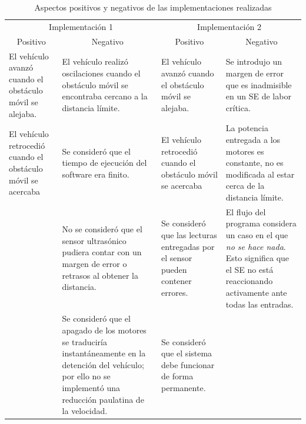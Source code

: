 \documentclass[journal]{IEEEtran}
\begin{document}
\begin{table}[!t]

\renewcommand{\arraystretch}{1.3}
\caption{Aspectos positivos y negativos de las implementaciones realizadas}
\label{tbl:aspectos-implementaciones}
\centering
{}
\begin{tabular}{p{4cm}p{4cm}p{4cm}p{4cm}}
\toprule

\multicolumn{2}{c}{Implementación 1} & \multicolumn{2}{c}{Implementación 2}\\
\cmidrule(r){1-2}  \cmidrule(r){3-4}

\multicolumn{1}{c}{Positivo} & \multicolumn{1}{c}{Negativo} & \multicolumn{1}{c}{Positivo} & \multicolumn{1}{c}{Negativo} \\
\midrule

El vehículo avanzó cuando el obstáculo móvil se alejaba.
&
El vehículo realizó oscilaciones cuando el obstáculo móvil se encontraba cercano a la distancia límite.
&
El vehículo avanzó cuando el obstáculo móvil se alejaba.
&
Se introdujo un margen de error que es inadmisible en un SE de labor crítica.
\\

El vehículo retrocedió cuando el obstáculo móvil se acercaba
&
Se consideró que el tiempo de ejecución del software era finito.
&
El vehículo retrocedió cuando el obstáculo móvil se acercaba
&
La potencia entregada a los motores es constante, no es modificada al estar cerca de la distancia límite.
\\

&
No se consideró que el sensor ultrasónico pudiera contar con un margen de error o retrasos al obtener la distancia.
&
Se consideró que las lecturas entregadas por el sensor pueden contener errores.
&
El flujo del programa considera un caso en el que \emph{no se hace nada}.
Esto significa que el SE no está reaccionando activamente ante todas las entradas.
\\

&
Se consideró que el apagado de los motores se traduciría instantáneamente en la detención del vehículo; por ello no se implementó una reducción paulatina de la velocidad.
&
Se consideró que el sistema debe funcionar de forma permanente.
&
\\
\bottomrule
\end{tabular}
\end{table}
\end{document}
